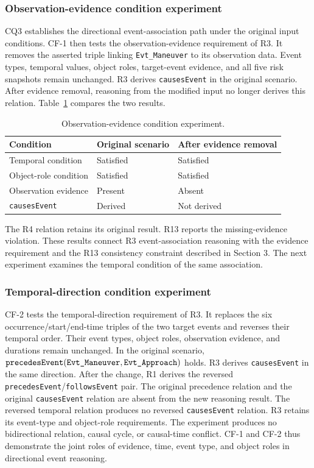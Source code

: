 \documentclass[Royal,sageh,times]{sagej}
\newcommand{\ont}[1]{{\urlstyle{tt}\nolinkurl{#1}}}
\newcommand{\ontm}[1]{\text{\normalfont\ttfamily\upshape #1}}
\begin{document}
\subsubsection{Observation-evidence condition experiment}

CQ3 establishes the directional event-association path under the original input conditions. CF-1 then tests the observation-evidence requirement of R3. It removes the asserted triple linking \ont{Evt\_Maneuver} to its observation data. Event types, temporal values, object roles, target-event evidence, and all five risk snapshots remain unchanged. R3 derives \ont{causesEvent} in the original scenario. After evidence removal, reasoning from the modified input no longer derives this relation. Table~\ref{tab:evidence-condition} compares the two results.
\begin{table}[!htbp]
  \centering
  \caption{Observation-evidence condition experiment.}
  \label{tab:evidence-condition}
  \footnotesize
  \begin{tabular}{lll}
    \toprule
    \textbf{Condition} & \textbf{Original scenario} & \textbf{After evidence removal} \\
    \midrule
    Temporal condition & Satisfied & Satisfied \\
    Object-role condition & Satisfied & Satisfied \\
    Observation evidence & Present & Absent \\
    \ont{causesEvent} & Derived & Not derived \\
    \bottomrule
  \end{tabular}
\end{table}
The R4 relation retains its original result. R13 reports the missing-evidence violation. These results connect R3 event-association reasoning with the evidence requirement and the R13 consistency constraint described in Section 3. The next experiment examines the temporal condition of the same association.

\subsubsection{Temporal-direction condition experiment}

CF-2 tests the temporal-direction requirement of R3. It replaces the six occurrence/start/end-time triples of the two target events and reverses their temporal order. Their event types, object roles, observation evidence, and durations remain unchanged. In the original scenario, $\ontm{precedesEvent}(\ontm{Evt\_Maneuver},\ontm{Evt\_Approach})$ holds. R3 derives \ont{causesEvent} in the same direction. After the change, R1 derives the reversed \ont{precedesEvent}/\ont{followsEvent} pair. The original precedence relation and the original \ont{causesEvent} relation are absent from the new reasoning result. The reversed temporal relation produces no reversed \ont{causesEvent} relation. R3 retains its event-type and object-role requirements. The experiment produces no bidirectional relation, causal cycle, or causal-time conflict. CF-1 and CF-2 thus demonstrate the joint roles of evidence, time, event type, and object roles in directional event reasoning.
\end{document}
